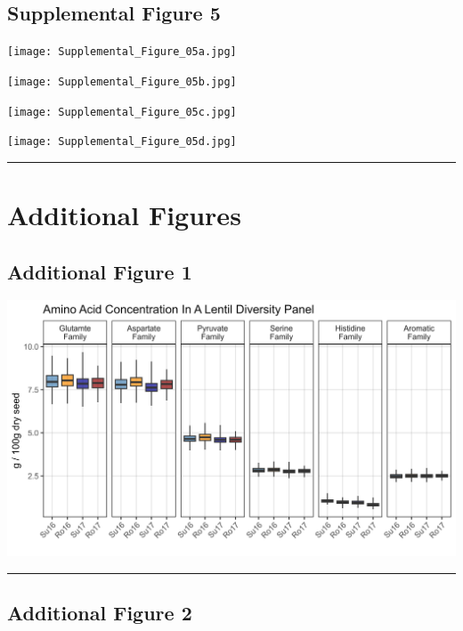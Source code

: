 \documentclass[
]{article}
\begin{document}
\hypertarget{supplemental-figure-5}{%
\subsection{Supplemental Figure 5}\label{supplemental-figure-5}}

\texttt{[image: Supplemental\_Figure\_05a.jpg]}

\texttt{[image: Supplemental\_Figure\_05b.jpg]}

\texttt{[image: Supplemental\_Figure\_05c.jpg]}

\texttt{[image: Supplemental\_Figure\_05d.jpg]}

\begin{center}\rule{0.5\linewidth}{0.5pt}\end{center}

\hypertarget{additional-figures}{%
\section{Additional Figures}\label{additional-figures}}

\hypertarget{additional-figure-1}{%
\subsection{Additional Figure 1}\label{additional-figure-1}}

\includegraphics{Additional/Additional_Figure_01.jpg}

\begin{center}\rule{0.5\linewidth}{0.5pt}\end{center}

\hypertarget{additional-figure-2}{%
\subsection{Additional Figure 2}\label{additional-figure-2}}
\end{document}
